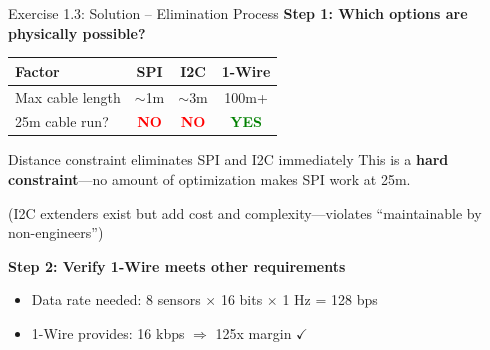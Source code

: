 \documentclass[aspectratio=169,11pt]{beamer}
\begin{document}
\begin{frame}{Exercise 1.3: Solution -- Elimination Process}
    \textbf{Step 1: Which options are physically possible?}
    
    \begin{center}
    \begin{tabular}{lccc}
        \toprule
        \textbf{Factor} & \textbf{SPI} & \textbf{I2C} & \textbf{1-Wire} \\
        \midrule
        Max cable length & $\sim$1m & $\sim$3m & 100m+ \\
        25m cable run? & \textcolor{red}{\textbf{NO}} & \textcolor{red}{\textbf{NO}} & \textcolor{green}{\textbf{YES}} \\
        \bottomrule
    \end{tabular}
    \end{center}
    
    \vspace{0.3cm}
    \begin{alertblock}{Distance constraint eliminates SPI and I2C immediately}
        This is a \textbf{hard constraint}---no amount of optimization makes SPI work at 25m.
        
        \vspace{0.1cm}
        (I2C extenders exist but add cost and complexity---violates ``maintainable by non-engineers'')
    \end{alertblock}
    
    \vspace{0.3cm}
    \textbf{Step 2: Verify 1-Wire meets other requirements}
    \begin{itemize}
        \item Data rate needed: 8 sensors $\times$ 16 bits $\times$ 1 Hz = 128 bps
        \item 1-Wire provides: 16 kbps $\Rightarrow$ 125x margin $\checkmark$
    \end{itemize}
\end{frame}
\end{document}
